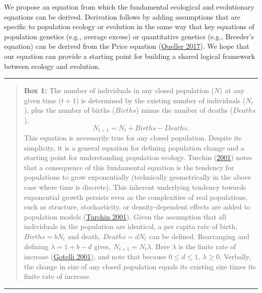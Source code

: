 \documentclass[
]{article}
\begin{document}
We propose an equation from which the fundamental ecological and
evolutionary equations can be derived. Derivation follows by adding
assumptions that are specific to population ecology or evolution in the
same way that key equations of population genetics (e.g., average
excess) or quantitative genetics (e.g., Breeder's equation) can be
derived from the Price equation
(\protect\hyperlink{ref-Queller2017}{Queller 2017}). We hope that our
equation can provide a starting point for building a shared logical
framework between ecology and evolution.

\begin{center}\rule{0.5\linewidth}{0.5pt}\end{center}

\begin{quote}
\textbf{Box 1:} The number of individuals in any closed population
(\(N\)) at any given time (\(t + 1\)) is determined by the existing
number of individuals (\(N_{t}\)), plus the number of births
(\(Births\)) minus the number of deaths (\(Deaths\)),
\[N_{t+1} = N_{t} + Births - Deaths.\] This equation is necessarily true
for any closed population. Despite its simplicity, it is a general
equation for defining population change and a starting point for
understanding population ecology. Turchin
(\protect\hyperlink{ref-Turchin2001}{2001}) notes that a consequence of
this fundamental equation is the tendency for populations to grow
exponentially (technically geometrically in the above case where time is
discrete). This inherent underlying tendency towards exponential growth
persists even as the complexities of real populations, such as
structure, stochasticity, or density-dependent effects are added to
population models (\protect\hyperlink{ref-Turchin2001}{Turchin 2001}).
Given the assumption that all individuals in the population are
identical, a per capita rate of birth, \(Births = bN_{t}\) and death,
\(Deaths = dN_{t}\) can be defined. Rearranging and defining
\(\lambda = 1 + b - d\) gives, \(N_{t+1} = N_{t}\lambda\). Here
\(\lambda\) is the finite rate of increase
(\protect\hyperlink{ref-Gotelli2001}{Gotelli 2001}), and note that
because \(0 \leq d \leq 1\), \(\lambda \geq 0\). Verbally, the change in
size of any closed population equals its existing size times its finite
rate of increase.
\end{quote}

\begin{center}\rule{0.5\linewidth}{0.5pt}\end{center}
\end{document}
